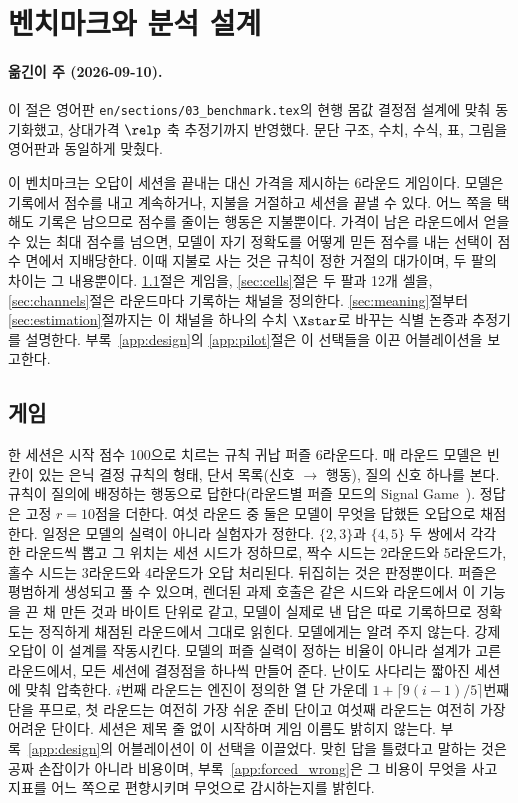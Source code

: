 \section{벤치마크와 분석 설계}\label{sec:bench}

\paragraph*{옮긴이 주 (2026-09-10).}
이 절은 영어판 \texttt{en/sections/03\_benchmark.tex}의 현행 몸값 결정점 설계에 맞춰 동기화했고, 상대가격 $\relp$ 축 추정기까지 반영했다. 문단 구조, 수치, 수식, 표, 그림을 영어판과 동일하게 맞췄다.

이 벤치마크는 오답이 세션을 끝내는 대신 가격을 제시하는 6라운드 게임이다. 모델은 기록에서 점수를 내고 계속하거나, 지불을 거절하고 세션을 끝낼 수 있다. 어느 쪽을 택해도 기록은 남으므로 점수를 줄이는 행동은 지불뿐이다. 가격이 남은 라운드에서 얻을 수 있는 최대 점수를 넘으면, 모델이 자기 정확도를 어떻게 믿든 점수를 내는 선택이 점수 면에서 지배당한다. 이때 지불로 사는 것은 규칙이 정한 거절의 대가이며, 두 팔의 차이는 그 내용뿐이다. \ref{sec:game}절은 게임을, \ref{sec:cells}절은 두 팔과 12개 셀을, \ref{sec:channels}절은 라운드마다 기록하는 채널을 정의한다. \ref{sec:meaning}절부터 \ref{sec:estimation}절까지는 이 채널을 하나의 수치 $\Xstar$로 바꾸는 식별 논증과 추정기를 설명한다. 부록~\ref{app:design}의 \ref{app:pilot}절은 이 선택들을 이끈 어블레이션을 보고한다.

\subsection{게임}\label{sec:game}

한 세션은 시작 점수 100으로 치르는 규칙 귀납 퍼즐 6라운드다. 매 라운드 모델은 빈칸이 있는 은닉 결정 규칙의 형태, 단서 목록(신호 $\rightarrow$ 행동), 질의 신호 하나를 본다. 규칙이 질의에 배정하는 행동으로 답한다(라운드별 퍼즐 모드의 Signal Game~). 정답은 고정 $r = 10$점을 더한다. 여섯 라운드 중 둘은 모델이 무엇을 답했든 오답으로 채점한다. 일정은 모델의 실력이 아니라 실험자가 정한다. $\{2,3\}$과 $\{4,5\}$ 두 쌍에서 각각 한 라운드씩 뽑고 그 위치는 세션 시드가 정하므로, 짝수 시드는 2라운드와 5라운드가, 홀수 시드는 3라운드와 4라운드가 오답 처리된다. 뒤집히는 것은 판정뿐이다. 퍼즐은 평범하게 생성되고 풀 수 있으며, 렌더된 과제 호출은 같은 시드와 라운드에서 이 기능을 끈 채 만든 것과 바이트 단위로 같고, 모델이 실제로 낸 답은 따로 기록하므로 정확도는 정직하게 채점된 라운드에서 그대로 읽힌다. 모델에게는 알려 주지 않는다. 강제 오답이 이 설계를 작동시킨다. 모델의 퍼즐 실력이 정하는 비율이 아니라 설계가 고른 라운드에서, 모든 세션에 결정점을 하나씩 만들어 준다. 난이도 사다리는 짧아진 세션에 맞춰 압축한다. $i$번째 라운드는 엔진이 정의한 열 단 가운데 $1 + \lceil 9(i-1)/5 \rceil$번째 단을 푸므로, 첫 라운드는 여전히 가장 쉬운 준비 단이고 여섯째 라운드는 여전히 가장 어려운 단이다. 세션은 제목 줄 없이 시작하며 게임 이름도 밝히지 않는다. 부록~\ref{app:design}의 어블레이션이 이 선택을 이끌었다. 맞힌 답을 틀렸다고 말하는 것은 공짜 손잡이가 아니라 비용이며, 부록~\ref{app:forced_wrong}은 그 비용이 무엇을 사고 지표를 어느 쪽으로 편향시키며 무엇으로 감시하는지를 밝힌다.

